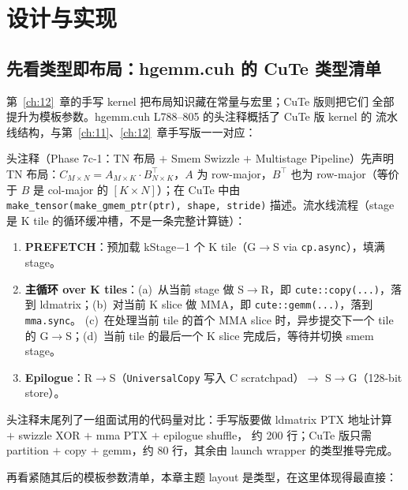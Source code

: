 \section{设计与实现}

\subsection{先看类型即布局：hgemm.cuh 的 CuTe 类型清单}

第~\ref{ch:12}~章的手写 kernel 把布局知识藏在常量与宏里；CuTe 版则把它们
全部提升为模板参数。hgemm.cuh L788--805 的头注释概括了 CuTe 版 kernel 的
流水线结构，与第~\ref{ch:11}、\ref{ch:12}~章手写版一一对应：

头注释（Phase 7c-1：TN 布局 $+$ Smem Swizzle $+$ Multistage Pipeline）先声明
TN 布局：$C_{M \times N} = A_{M \times K} \cdot B^{\top}_{N \times K}$，$A$
为 row-major，$B^{\top}$ 也为 row-major（等价于 $B$ 是 col-major 的
$[K \times N]$）；在 CuTe 中由
\texttt{make\_\allowbreak{}tensor\allowbreak{}(make\_\allowbreak{}gmem\_\allowbreak{}ptr\allowbreak{}(ptr),\allowbreak{} shape,\allowbreak{} stride)}
描述。流水线流程（stage 是 K tile 的循环缓冲槽，不是一条完整计算链）：

\begin{enumerate}
  \item \textbf{PREFETCH}：预加载 kStage$-$1 个 K tile（G$\to$S via
        \texttt{cp.async}），填满 stage。
  \item \textbf{主循环 over K tiles}：(a)~从当前 stage 做 S$\to$R，即
        \texttt{cute::copy(...)}，落到 ldmatrix；(b)~对当前 K slice 做
        MMA，即 \texttt{cute::gemm(...)}，落到 \texttt{mma.sync}。
        (c)~在处理当前 tile 的首个 MMA slice 时，异步提交下一个 tile 的
        G$\to$S；(d)~当前 tile 的最后一个 K slice 完成后，等待并切换
        smem stage。
  \item \textbf{Epilogue}：R$\to$S（\texttt{UniversalCopy} 写入 C
        scratchpad）$\to$ S$\to$G（128-bit store）。
\end{enumerate}

头注释末尾列了一组面试用的代码量对比：手写版要做
ldmatrix PTX 地址计算 $+$ swizzle XOR $+$ mma PTX $+$ epilogue shuffle，
约 200 行；CuTe 版只需 partition $+$ copy $+$ gemm，约 80 行，其余由
launch wrapper 的类型推导完成。

再看紧随其后的模板参数清单，本章主题 layout 是类型，在这里体现得最直接：



